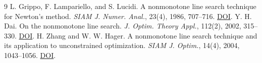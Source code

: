 \documentclass[11pt,a4paper,UTF8,fontset=fandol]{ctexart}
\begin{document}
\begin{thebibliography}{9}
 L. Grippo, F. Lampariello, and S. Lucidi. A nonmonotone line search technique for Newton's method. \emph{SIAM J. Numer. Anal.}, 23(4), 1986, 707--716. \href{https://doi.org/10.1137/0723046}{DOI}.
 Y. H. Dai. On the nonmonotone line search. \emph{J. Optim. Theory Appl.}, 112(2), 2002, 315--330. \href{https://doi.org/10.1023/A:1013653923062}{DOI}.
 H. Zhang and W. W. Hager. A nonmonotone line search technique and its application to unconstrained optimization. \emph{SIAM J. Optim.}, 14(4), 2004, 1043--1056. \href{https://doi.org/10.1137/S1052623403428208}{DOI}.
\end{thebibliography}
\end{document}
